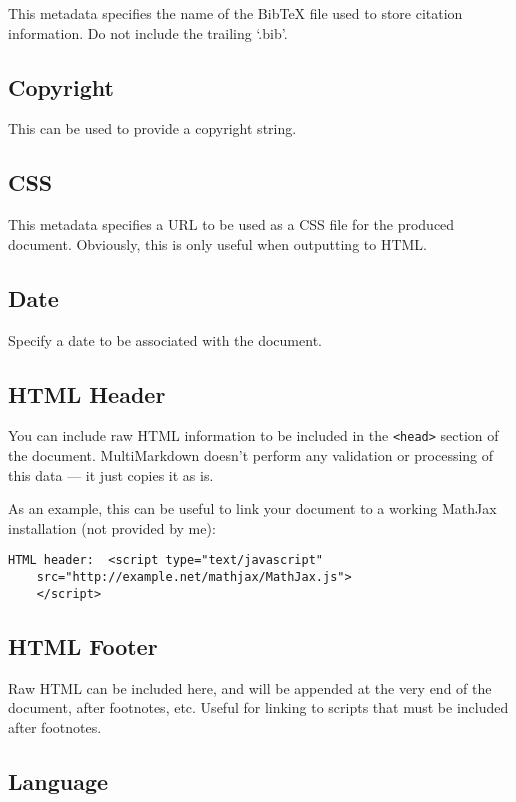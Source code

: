 This metadata specifies the name of the BibTeX file used to store citation
information. Do not include the trailing `.bib'.

\subsection{Copyright }
\label{copyright}

This can be used to provide a copyright string.

\subsection{CSS }
\label{css}

This metadata specifies a URL to be used as a CSS file for the produced
document. Obviously, this is only useful when outputting to HTML.

\subsection{Date }
\label{date}

Specify a date to be associated with the document.

\subsection{HTML Header }
\label{htmlheader}

You can include raw HTML information to be included in the \texttt{<head>} section of the document. MultiMarkdown doesn't perform any validation or processing of this data --- it just copies it as is.

As an example, this can be useful to link your document to a working MathJax
installation (not provided by me):

\begin{verbatim}
HTML header:  <script type="text/javascript"
	src="http://example.net/mathjax/MathJax.js">
	</script>
\end{verbatim}

\subsection{HTML Footer }
\label{htmlfooter}

Raw HTML can be included here, and will be appended at the very end of the document, after footnotes, etc. Useful for linking to scripts that must be included after footnotes.

\subsection{Language }
\label{language}

